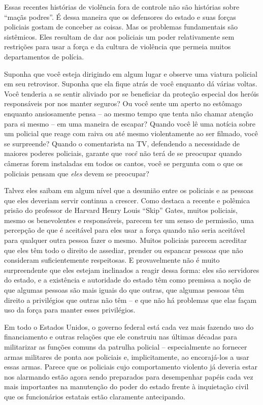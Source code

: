Essas recentes histórias de violência fora de controle não são histórias sobre ``maçãs podres''. É dessa maneira que os defensores do estado e suas forças policiais gostam de conceber as coisas. Mas os problemas fundamentais são sistêmicos. Eles resultam de dar aos policiais um poder relativamente sem restrições para usar a força e da cultura de violência que permeia muitos departamentos de polícia.

Suponha que você esteja dirigindo em algum lugar e observe uma viatura policial em seu retrovisor. Suponha que ela fique atrás de você enquanto dá várias voltas. Você tenderia a se sentir aliviado por se beneficiar da proteção especial dos heróis responsáveis por nos manter seguros? Ou você sente um aperto no estômago enquanto ansiosamente pensa -- ao mesmo tempo que tenta não chamar atenção para si mesmo -- em uma maneira de escapar? Quando você lê uma notícia sobre um policial que reage com raiva ou até mesmo violentamente ao ser filmado, você se surpreende? Quando o comentarista na TV, defendendo a necessidade de maiores poderes policiais, garante que \emph{você} não terá de se preocupar quando câmeras forem instaladas em todos os cantos, você se pergunta com o que os policiais pensam que \emph{eles} devem se preocupar?

Talvez eles saibam em algum nível que a desunião entre os policiais e as pessoas que eles deveriam servir continua a crescer. Como destaca a recente e polêmica prisão do professor de Harvard Henry Louis ``Skip'' Gates, muitos policiais, mesmo os benevolentes e responsáveis, parecem ter um senso de permissão, uma percepção de que é aceitável para eles usar a força quando não seria aceitável para qualquer outra pessoa fazer o mesmo. Muitos policiais parecem acreditar que eles têm todo o direito de assediar, prender ou espancar pessoas que não consideram suficientemente respeitosas. E provavelmente não é muito surpreendente que eles estejam inclinados a reagir dessa forma: eles são servidores do estado, e a existência e autoridade do estado têm como premissa a noção de que algumas pessoas são mais iguais do que outras, que algumas pessoas têm direito a privilégios que outras não têm -- e que não há problemas que elas façam uso da força para manter esses privilégios.

Em todo o Estados Unidos, o governo federal está cada vez mais fazendo uso do financiamento e outras relações que ele construiu nas últimas décadas para militarizar as funções comuns da patrulha policial -- especialmente ao fornecer armas militares de ponta aos policiais e, implicitamente, ao encorajá-los a usar essas armas. Parece que os policiais cujo comportamento violento já deveria estar nos alarmando estão agora sendo preparados para desempenhar papéis cada vez mais importantes na manutenção do poder do estado frente à inquietação civil que os funcionários estatais estão claramente antecipando.

